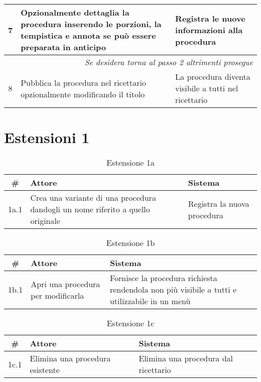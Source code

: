 \begin{tabular}{|c|p{7cm}|p{6.5cm}|}
      7                  & Opzionalmente dettaglia la procedura inserendo le porzioni, la tempistica e annota se può essere preparata in anticipo           & Registra le nuove informazioni alla procedura             \\\hline
      \multicolumn{3}{|r|}{\textit{Se desidera torna al passo 2 altrimenti prosegue}}                                                                                                                                   \\\hline
      8                  & Pubblica la procedura nel ricettario opzionalmente modificando il titolo                                                         & La procedura diventa visibile a tutti nel ricettario      \\\hline
\end{tabular}

\section*{Estensioni 1}
\begin{table}[H]\caption*{Estensione 1a}
      \small
      \begin{tabular}{|c|p{7cm}|p{6.23cm}|}
            \hline\bfseries \# & \bfseries Attore                                                                & \bfseries Sistema           \\\hline
            1a.1               & Crea una variante di una procedura dandogli un nome riferito a quello originale & Registra la nuova procedura \\\hline
      \end{tabular}
\end{table}

\begin{table}[H]\caption*{Estensione 1b}
      \small
      \begin{tabular}{|c|p{7cm}|p{6.23cm}|}
            \hline\bfseries \# & \bfseries Attore                   & \bfseries Sistema                                                                             \\\hline
            1b.1               & Apri una procedura per modificarla & Fornisce la procedura richiesta rendendola non più visibile a tutti e utilizzabile in un menù \\\hline
      \end{tabular}
\end{table}

\begin{table}[H]\caption*{Estensione 1c}
      \small
      \begin{tabular}{|c|p{7cm}|p{6.24cm}|}
            \hline\bfseries \# & \bfseries Attore                & \bfseries Sistema                    \\\hline
            1c.1               & Elimina una procedura esistente & Elimina una procedura dal ricettario \\\hline
      \end{tabular}
\end{table}

